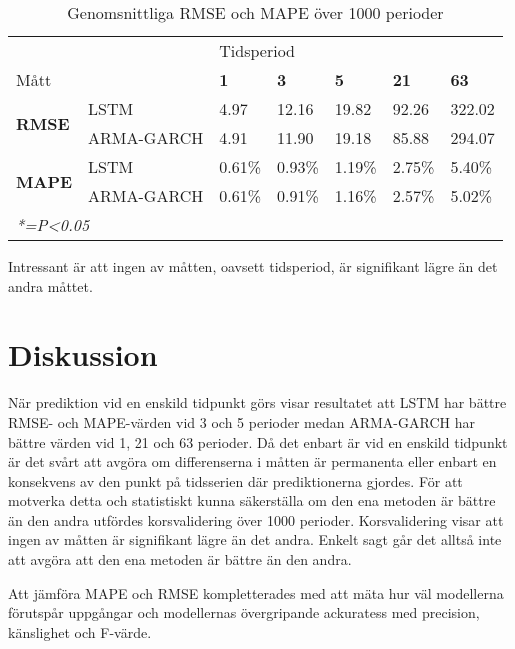 \documentclass[12pt]{article}
\begin{document}
\begin{table}[H]
\caption{Genomsnittliga RMSE och MAPE över 1000 perioder}
\begin{tabular}{||lllllll||}
\hline
                                     &            & \multicolumn{5}{l||}{Tidsperiod}                                  \\
Mått                                 &            & \textbf{1} & \textbf{3} & \textbf{5} & \textbf{21} & \textbf{63} \\ \hline\hline
\multirow{2}{*}{\textbf{RMSE}}  & LSTM       & 4.97          & 12.16         & 19.82          & 92.26           & 322.02        \\
                                & ARMA-GARCH & 4.91          & 11.90         & 19.18          & 85.88            & 294.07           \\ \cline{2-7} 
\multirow{2}{*}{\textbf{MAPE}}  & LSTM       & 0.61\%        & 0.93\%       & 1.19\%        & 2.75\%          & 5.40\%        \\
                                & ARMA-GARCH & 0.61\%        & 0.91\%       & 1.16\%        & 2.57\%          & 5.02\%        
                                \\ \hline
\multicolumn{5}{l}{\textit{*=P\textless{}0.05}}
\end{tabular}
\end{table}

Intressant är att ingen av måtten, oavsett tidsperiod, är signifikant lägre än det andra måttet.

\newpage
\section{Diskussion}
När prediktion vid en enskild tidpunkt görs visar resultatet att LSTM har bättre RMSE- och MAPE-värden vid 3 och 5 perioder medan ARMA-GARCH har bättre värden vid 1, 21 och 63 perioder. Då det enbart är vid en enskild tidpunkt är det svårt att avgöra om differenserna i måtten är permanenta eller enbart en konsekvens av den punkt på tidsserien där prediktionerna gjordes. För att motverka detta och statistiskt kunna säkerställa om den ena metoden är bättre än den andra utfördes korsvalidering över 1000 perioder. Korsvalidering visar att ingen av måtten är signifikant lägre än det andra. Enkelt sagt går det alltså inte att avgöra att den ena metoden är bättre än den andra. 

\par Att jämföra MAPE och RMSE kompletterades med att mäta hur väl modellerna förutspår uppgångar och modellernas övergripande ackuratess med precision, känslighet och F-värde. 
\end{document}
